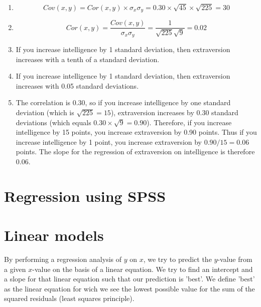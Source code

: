 \documentclass[]{book}\usepackage[]{graphicx}\usepackage[]{color}
\begin{document}
\begin{enumerate}

\item

\begin{equation}
Cov(x,y)= Cor(x,y) \times \sigma_x \sigma_y= 0.30 \times \sqrt{45}\times \sqrt{225}=30
\end{equation}



\item

\begin{equation}
Cor(x,y)= \frac{Cov(x,y)} { \sigma_x \sigma_y}= \frac{1} { \sqrt{225} \sqrt{9}}=0.02
\end{equation}

\item
If you increase intelligence by 1 standard deviation, then extraversion increases with a tenth of a standard deviation.

\item
If you increase intelligence by 1 standard deviation, then extraversion increases with 0.05 standard deviations.

\item
The correlation is 0.30, so if you increase intelligence by one standard deviation (which is $\sqrt{225}=15$), extraversion increases by 0.30 standard deviations (which equals $0.30 \times \sqrt{9}=0.90$). Therefore, if you increase intelligence by 15 points, you increase extraversion by 0.90 points. Thus if you increase intelligence by 1 point, you increase extraversion by $0.90/15=0.06$ points. The slope for the regression of extraversion on intelligence is therefore 0.06.


\end{enumerate}


\section{Regression using SPSS}



\section{Linear models}

By performing a regression analysis of $y$ on $x$, we try to predict the $y$-value from a given $x$-value on the basis of a linear equation. We try to find an intercept and a slope for that linear equation such that our prediction is 'best'. We define 'best' as the linear equation for wich we see the lowest possible value for the sum of the squared residuals (least squares principle).
\end{document}
